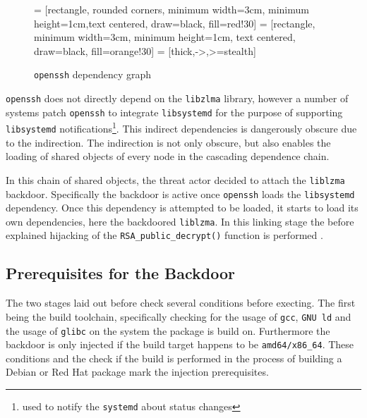 \begin{figure}[H]
    \centering

     = [rectangle, rounded corners, minimum width=3cm, minimum height=1cm,text centered, draw=black, fill=red!30]
     = [rectangle, minimum width=3cm, minimum height=1cm, text centered, draw=black, fill=orange!30]
     = [thick,->,>=stealth]
    \label{chart:dependecies}
    \caption{\texttt{openssh} dependency graph}
\end{figure}

\texttt{openssh} does not directly depend on the \texttt{libzlma} library,
however a number of systems patch \texttt{openssh} to integrate
\texttt{libsystemd} for the purpose of supporting \texttt{libsystemd}
notifications\footnote{used to notify the \texttt{systemd} about status
changes}. This indirect dependencies is dangerously obscure due to the
indirection. The indirection is not only obscure, but also enables the loading
of shared objects of every node in the cascading dependence chain. 

In this chain of shared objects, the threat actor decided to attach the
\texttt{liblzma} backdoor. Specifically the backdoor is active once
\texttt{openssh} loads the \texttt{libsystemd} dependency. Once this dependency
is attempted to be loaded, it starts to load its own dependencies, here the
backdoored \texttt{liblzma}. In this linking stage the before explained
hijacking of the \texttt{RSA\_public\_decrypt()} function is performed
\cite{arstechnica2024xzutils, github2024commit}.

\subsection{Prerequisites for the Backdoor}

The two stages laid out before check several conditions before execting. The
first being the build toolchain, specifically checking for the usage of
\texttt{gcc}, \texttt{GNU ld} and the usage of \texttt{glibc} on the system
the package is build on. Furthermore the backdoor is only injected if the
build target happens to be \texttt{amd64/x86\_64}. These conditions and the
check if the build is performed in the process of building a Debian or Red
Hat package mark the injection prerequisites.

